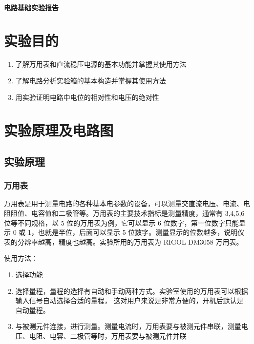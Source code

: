 \documentclass[a4paper,utf8]{article}
\begin{document}
\begin{center}
    {\mbox{}\\[7em]\bfseries\songti%
    电路基础实验报告}\\[34mm]
\end{center}
\newpage
\section{实验目的}
\begin{enumerate}
    \item 了解万用表和直流稳压电源的基本功能并掌握其使用方法
    \item 了解电路分析实验箱的基本构造并掌握其使用方法
    \item 用实验证明电路中电位的相对性和电压的绝对性
\end{enumerate}

\section{实验原理及电路图}%
    \subsection{实验原理}
    \subsubsection{万用表}
        万用表是用于测量电路的各种基本电参数的设备，可以测量交直流电压、电流、电阻阻值、电容值和二极管等。万用表的主要技术指标是测量精度，通常有 3,4,5,6位等不同规格，以 5 位的万用表为例，它可以显示 6 位数字，第一位数字只能显示 0 或 1，也就是半位，后面可以显示 5 位数字。测量显示的位数越多，说明仪表的分辨率越高，精度也越高。实验所用的万用表为 RIGOL DM3058 万用表。\par
        使用方法：
        \begin{enumerate}
            \item 选择功能
            \item 选择量程，量程的选择有自动和手动两种方式。实验室使用的万用表可以根据输入信号自动选择合适的量程， 这对用户来说是非常方便的，开机后默认是自动量程。
            \item 与被测元件连接，进行测量。测量电流时，万用表要与被测元件串联，测量电压、电阻、电容、二极管等时，万用表要与被测元件并联
        \end{enumerate}
\end{document}
